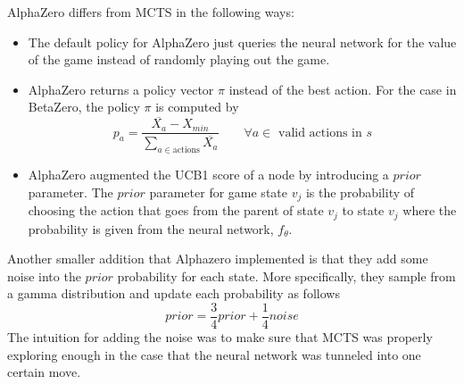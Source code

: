 \documentclass[letterpaper]{article} %
\begin{document}
  AlphaZero differs from MCTS in the following ways:
  \begin{itemize}
    \item The default policy for AlphaZero just queries the neural network for
      the value of the game instead of randomly playing out the game.
    \item AlphaZero returns a policy vector $\pi$ instead of the best action.
      For the case in BetaZero, the policy $\pi$ is computed by
      \[p_a = \frac{\overline{X_a} - X_{min}}{\sum_{a\in \text{actions}}
      \overline{X_a}}\quad\quad \forall a\in \text{ valid actions in $s$}\]
    \item AlphaZero augmented the UCB1 score of a node by introducing a $prior$
      parameter. The $prior$ parameter for game state $v_j$ is the probability
      of choosing the action that goes from the parent of state $v_j$ to state
      $v_j$ where the probability is given from the neural network, $f_\theta$. 
  \end{itemize}
  Another smaller addition that Alphazero implemented is that they add some
  noise into the $prior$ probability for each state. More specifically, they
  sample from a gamma distribution and update each probability as follows
  \[prior = \frac{3}{4}prior + \frac{1}{4}noise\]
  The intuition for adding the noise was to make sure that MCTS was properly
  exploring enough in the case that the neural network was tunneled into one
  certain move.
\end{document}
